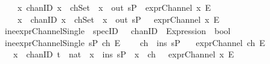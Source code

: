 \begin{isabellebody}
\ \ \ {\isacharparenleft}{\isacharparenleft}{\isasymforall}\ {\isacharparenleft}x\ {\isacharcolon}{\isacharcolon}chanID{\isacharparenright}{\isachardot}\ {\isacharparenleft}{\isacharparenleft}x\ {\isasymin}\ chSet{\isacharparenright}\ {\isasymlongrightarrow}\ {\isacharparenleft}{\isacharparenleft}x\ {\isasymin}\ {\isacharparenleft}out\ sP{\isacharparenright}{\isacharparenright}\ {\isasymand}\ {\isacharparenleft}exprChannel\ x\ E{\isacharparenright}{\isacharparenright}{\isacharparenright}{\isacharparenright}\isanewline
\ \ \ {\isasymand}\isanewline
\ \ \ {\isacharparenleft}{\isasymforall}\ {\isacharparenleft}x\ {\isacharcolon}{\isacharcolon}\ chanID{\isacharparenright}{\isachardot}\ {\isacharparenleft}{\isacharparenleft}x\ {\isasymnotin}\ chSet{\isacharparenright}\ {\isasymand}\ {\isacharparenleft}x\ {\isasymin}\ {\isacharparenleft}out\ sP{\isacharparenright}{\isacharparenright}\ {\isasymlongrightarrow}\ {\isasymnot}\ exprChannel\ x\ E{\isacharparenright}{\isacharparenright}{\isacharparenright}{\isachardoublequoteclose}\isanewline
\isanewline
%
\isanewline
%
\isanewline
%
\isanewline
{}\isamarkupfalse%
\isanewline
\ ine{\isacharunderscore}exprChannelSingle\ {\isacharcolon}{\isacharcolon}\ {\isachardoublequoteopen}specID\ \ {\isasymRightarrow}\ chanID\ {\isasymRightarrow}\ Expression\ {\isasymRightarrow}\ bool{\isachardoublequoteclose}\isanewline
{}\isanewline
\ {\isachardoublequoteopen}ine{\isacharunderscore}exprChannelSingle\ sP\ ch\ E\ {\isasymequiv}\ \isanewline
\ \ {\isacharparenleft}ch\ {\isasymin}\ {\isacharparenleft}ins\ sP{\isacharparenright}{\isacharparenright}\ {\isasymand}\isanewline
\ \ {\isacharparenleft}exprChannel\ ch\ E{\isacharparenright}\ \ {\isasymand}\isanewline
\ \ {\isacharparenleft}{\isasymforall}\ {\isacharparenleft}x\ {\isacharcolon}{\isacharcolon}\ chanID{\isacharparenright}\ {\isacharparenleft}t\ {\isacharcolon}{\isacharcolon}\ nat{\isacharparenright}{\isachardot}\ {\isacharparenleft}{\isacharparenleft}\ x\ {\isasymin}\ {\isacharparenleft}ins\ sP{\isacharparenright}{\isacharparenright}\ {\isasymand}\ {\isacharparenleft}x\ {\isasymnoteq}\ ch{\isacharparenright}\ {\isasymlongrightarrow}\ {\isasymnot}\ exprChannel\ x\ E{\isacharparenright}{\isacharparenright}{\isachardoublequoteclose}\isanewline
\isanewline
%
\end{isabellebody}
